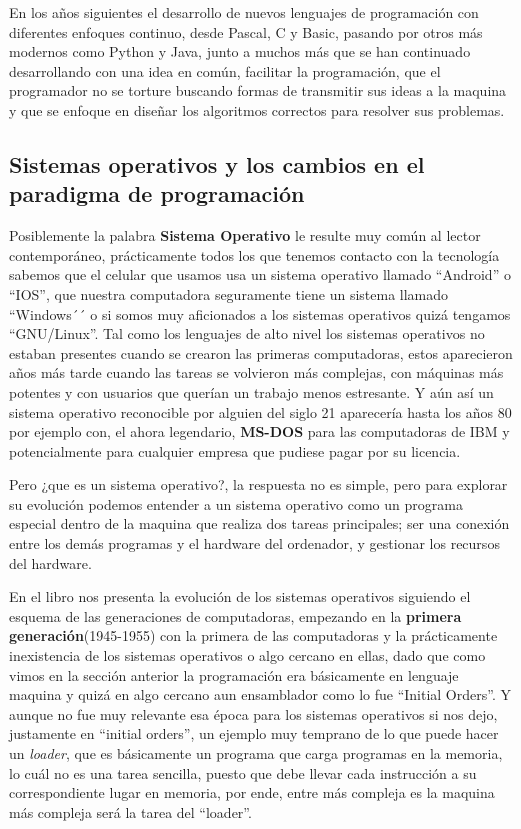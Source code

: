 \documentclass[letterpaper,12pt,oneside]{book}
\begin{document}
		
		En los años siguientes el desarrollo de nuevos lenguajes de programación con diferentes enfoques continuo, desde Pascal, C y Basic, pasando por otros más modernos 
		como Python y Java, junto a muchos más que
		se han continuado desarrollando con una idea en común, facilitar la programación, que el programador no se torture buscando formas de transmitir sus
		ideas a la maquina y que se enfoque en diseñar los algoritmos correctos para resolver sus problemas.
		


		\clearpage
		\subsection{Sistemas operativos y los cambios en el paradigma de programación}
		
		Posiblemente la palabra \textbf{Sistema Operativo} le resulte muy común al lector contemporáneo, prácticamente todos los que tenemos contacto con
		la tecnología sabemos que el celular que usamos usa un sistema operativo llamado ``Android'' o ``IOS'', que nuestra computadora seguramente tiene
		un sistema llamado ``Windows´´ o si somos muy aficionados a los sistemas operativos quizá tengamos ``GNU/Linux''. Tal como los lenguajes
		de alto nivel los sistemas operativos no estaban presentes cuando se crearon las primeras computadoras, estos aparecieron años más tarde cuando
		las tareas se volvieron más complejas, con máquinas más potentes y con usuarios que querían un trabajo menos estresante. Y aún así un sistema operativo
		reconocible por alguien del siglo 21 aparecería hasta los años 80 por ejemplo con, el ahora legendario, \textbf{MS-DOS} para las computadoras de IBM y potencialmente
		para cualquier empresa que pudiese pagar por su licencia.
		
		Pero ¿que es un sistema operativo?, la respuesta no es simple, pero para explorar su evolución podemos entender a un sistema operativo como un programa especial 
		dentro de la maquina que realiza dos tareas principales; ser una conexión entre los demás programas y el hardware del ordenador, 
		y gestionar los recursos del hardware\cite{tanenbaum_modern_2002}.
		
		En el libro \cite{tanenbaum_modern_2002} nos presenta la evolución de los sistemas operativos siguiendo
		el esquema de las generaciones de computadoras, empezando en
		la \textbf{primera generación}(1945-1955) con la primera de las computadoras y la prácticamente inexistencia de los sistemas operativos o algo cercano en ellas,
		dado que como vimos en la sección anterior la programación era básicamente en lenguaje maquina y quizá en algo cercano aun ensamblador como
		lo fue ``Initial Orders''. Y aunque no fue muy relevante esa época para los sistemas operativos si nos dejo, justamente en ``initial orders'', un ejemplo
		muy temprano de lo que puede hacer un \textit{loader}, que es básicamente un programa que carga programas en la memoria, lo cuál no es una tarea sencilla,
		puesto que debe llevar cada instrucción a su correspondiente lugar en memoria, por ende, entre más compleja es la maquina más compleja
		será la tarea del ``loader''\cite{salomon_assemblers_1992}.
		
\end{document}
